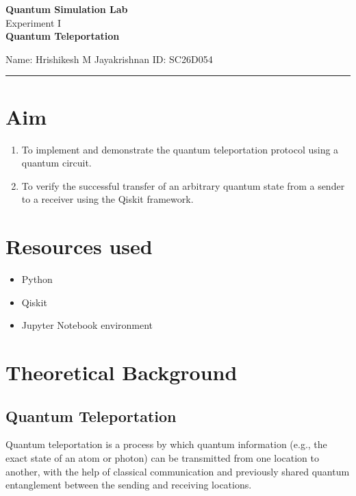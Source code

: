 \documentclass[12pt]{article}
\begin{document}
\begin{center}
    {\Large \textbf{Quantum Simulation Lab}} \\
    \vspace{0.8cm}
    {\Large Experiment I} \\
    \vspace{0.2cm}
    {\Large \textbf{Quantum Teleportation}} \\
\end{center}

\vspace{0.5cm}
\noindent Name: Hrishikesh M Jayakrishnan \hfill ID: SC26D054
\vspace{1em}
\hrule

\vspace{1em}
\section{Aim}
\begin{enumerate}
    \item To implement and demonstrate the quantum teleportation protocol using a quantum circuit.
    \item To verify the successful transfer of an arbitrary quantum state from a sender to a receiver using the Qiskit framework.
\end{enumerate}

\section{Resources used}
\begin{itemize}
    \item Python
    \item Qiskit 
    \item Jupyter Notebook environment
\end{itemize}

\section{Theoretical Background}
\subsection{Quantum Teleportation}
Quantum teleportation is a process by which quantum information (e.g., the exact state of an atom or photon) can be transmitted from one location to another, with the help of classical communication and previously shared quantum entanglement between the sending and receiving locations.
\end{document}
